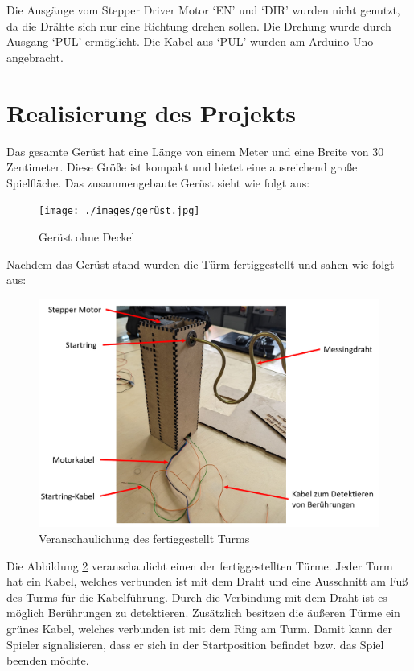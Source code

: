 Die Ausgänge vom Stepper Driver Motor `EN' und `DIR' wurden nicht genutzt, da die Drähte sich nur eine Richtung drehen sollen. Die Drehung wurde durch Ausgang `PUL' ermöglicht. Die Kabel aus `PUL' wurden am Arduino Uno angebracht.

\section{Realisierung des Projekts}

Das gesamte Gerüst hat eine Länge von einem Meter und eine Breite von 30 Zentimeter. Diese Größe ist kompakt und  bietet eine ausreichend große Spielfläche. Das zusammengebaute Gerüst sieht wie folgt aus:

\begin{figure}[H]
 \centerline{\texttt{[image: ./images/gerüst.jpg]}}
 \caption{Gerüst ohne Deckel}\label{turm}
\end{figure} 


Nachdem das Gerüst stand wurden die Türm fertiggestellt und sahen wie folgt aus:

\begin{figure}[H]
 \centerline{\includegraphics[width=.85\textwidth,scale=1]{./images/turm_holz.png}}
 \caption{Veranschaulichung des fertiggestellt Turms}\label{turm}
\end{figure} 

Die Abbildung \ref{turm} veranschaulicht einen der fertiggestellten Türme. Jeder Turm hat ein Kabel, welches verbunden ist mit dem Draht und eine Ausschnitt am Fuß des Turms für die Kabelführung. Durch die Verbindung mit dem Draht ist es möglich Berührungen zu detektieren. Zusätzlich besitzen die äußeren Türme ein grünes Kabel, welches verbunden ist mit dem Ring am Turm. Damit kann der Spieler signalisieren, dass er sich in der Startposition befindet bzw. das Spiel beenden möchte.

